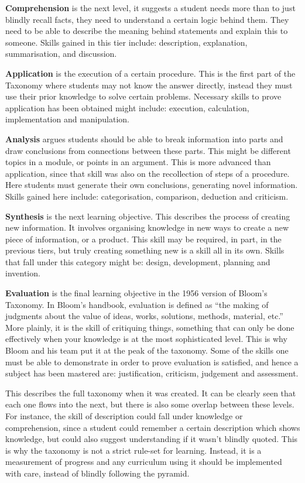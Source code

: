 \textbf{Comprehension} is the next level, it suggests a student needs more than to just blindly recall facts, they need to understand a certain logic behind them. They need to be able to describe the meaning behind statements and explain this to someone. Skills gained in this tier include: description, explanation, summarisation, and discussion.

\textbf{Application} is the execution of a certain procedure. This is the first part of the Taxonomy where students may not know the answer directly, instead they must use their prior knowledge to solve certain problems. Necessary skills to prove application has been obtained might include: execution, calculation, implementation and manipulation.

\textbf{Analysis} argues students should be able to break information into parts and draw conclusions from connections between these parts. This might be different topics in a module, or points in an argument.  This is more advanced than application, since that skill was also on the recollection of steps of a procedure. Here students must generate their own conclusions, generating novel information. Skills gained here include: categorisation, comparison, deduction and criticism.

\textbf{Synthesis} is the next learning objective. This describes the process of creating new information. It involves organising knowledge in new ways to create a new piece of information, or a product. This skill may be required, in part, in the previous tiers, but truly creating something new is a skill all in its own. Skills that fall under this category might be: design, development, planning and invention.

\textbf{Evaluation} is the final learning objective in the 1956 version of Bloom's Taxonomy. In Bloom's handbook, evaluation is defined as ``the making of judgments about the value of ideas, works, solutions, methods, material, etc.'' More plainly, it is the skill of critiquing things, something that can only be done effectively when your knowledge is at the most sophisticated level. This is why Bloom and his team put it at the peak of the taxonomy. Some of the skills one must be able to demonstrate in order to prove evaluation is satisfied, and hence a subject has been mastered are: justification, criticism, judgement and assessment.

This describes the full taxonomy when it was created. It can be clearly seen that each one flows into the next, but there is also some overlap between these levels. For instance, the skill of description could fall under knowledge or comprehension, since a student could remember a certain description which shows knowledge, but could also suggest understanding if it wasn't blindly quoted. This is why the taxonomy is not a strict rule-set for learning. Instead, it is a measurement of progress and any curriculum using it should be implemented with care, instead of blindly following the pyramid.

